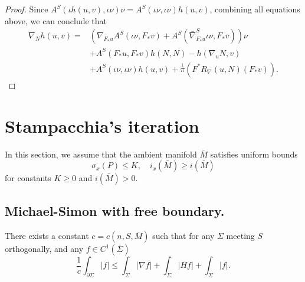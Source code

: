 \begin{proof}
    Since $A^S(\iota  h(u,v) , \iota \nu ) \nu =A^S(\iota  \nu  , \iota \nu )h(u,v)$, combining all equations above, we can conclude that 
    \begin{equation*}
        \begin{split}
            \nabla _N h(u,v)
            =& \left( \nabla _{F_*u}A^S(\iota \nu , F_*v)+A^S(\bar{\nabla }^{S}_{F_*u} \iota \nu , F_*v)  \right)   \nu \\
            & +A^S(F_*u, F_* v)h(N,N)-h(\nabla_u N, v) \\
            & + A^S(\iota  \nu  , \iota \nu )h(u,v) +\overset{\perp }{\pi} (F^*R_{\nabla }(u,N)(F_* v)).
    \end{split}
    \end{equation*} 
\end{proof}

\section{Stampacchia's iteration} \label{sec:si}

In this section, we assume that the ambient manifold $\bar{M}$ satisfies uniform bounds
\[\sigma _x(P) \leq K, \quad i_x(\bar{M}) \geq i(\bar{M})\]
for constants $K \geq 0$ and $i(\bar{M})>0$.

\subsection{Michael-Simon with free boundary.}

\begin{lemma}\label{BoundaryIntegral}
    There exists a constant $c=c(n,S,\bar{M})$ such that for any $\Sigma $ meeting $S$ orthogonally, and any $f \in C^1(\bar{\Sigma })$ 
    \[
        \frac{1}{c}\int_{\partial \Sigma } \left| f \right| \leq \int_{ \Sigma} \left| \nabla f \right| + \int_{ \Sigma} \left| Hf \right| + \int_{ \Sigma} \left| f \right| .   
    \]
\end{lemma}

